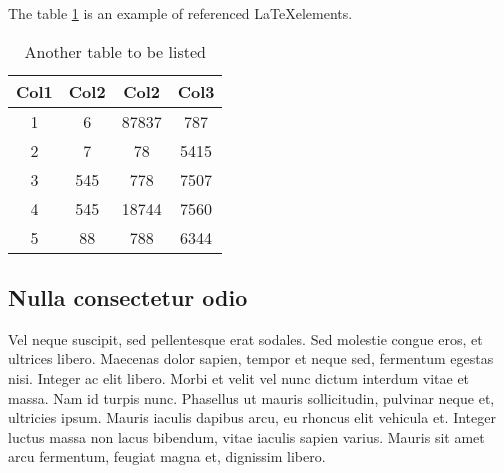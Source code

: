 The table \ref{table:2} is an example of referenced \LaTeX elements.

\begin{table}[htb]

    \centering
    \caption{Another table to be listed}
    \begin{tabular}{||c c c c||} 
 \hline
 Col1 & Col2 & Col2 & Col3 \\ [0.5ex] 
 \hline\hline
 1 & 6 & 87837 & 787 \\ 
 2 & 7 & 78 & 5415 \\
 3 & 545 & 778 & 7507 \\
 4 & 545 & 18744 & 7560 \\
 5 & 88 & 788 & 6344 \\ [1ex] 
 \hline
\end{tabular}
    \label{table:2}
\end{table}

\subsection{Nulla consectetur odio}
Vel neque suscipit, sed pellentesque erat sodales. Sed molestie congue eros, et ultrices libero. Maecenas dolor sapien, tempor et neque sed, fermentum egestas nisi. Integer ac elit libero. Morbi et velit vel nunc dictum interdum vitae et massa. Nam id turpis nunc. Phasellus ut mauris sollicitudin, pulvinar neque et, ultricies ipsum. Mauris iaculis dapibus arcu, eu rhoncus elit vehicula et. Integer luctus massa non lacus bibendum, vitae iaculis sapien varius. Mauris sit amet arcu fermentum, feugiat magna et, dignissim libero\cite{latexcompanion}.